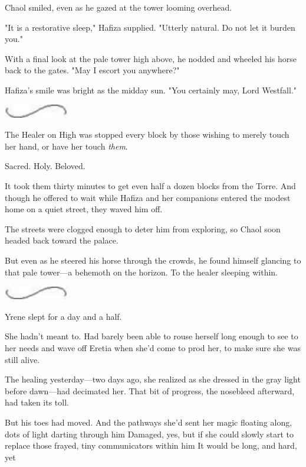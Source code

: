 Chaol smiled, even as he gazed at the tower looming overhead.

"It is a restorative sleep," Hafiza supplied. "Utterly natural. Do not let it burden you."

With a final look at the pale tower high above, he nodded and wheeled his horse back to the gates. "May I escort you anywhere?"

Hafiza's smile was bright as the midday sun. "You certainly may, Lord Westfall."

\includegraphics[width=1.12in,height=0.24in]{images/seperator}

The Healer on High was stopped every block by those wishing to merely touch her hand, or have her touch \emph{them}.

Sacred. Holy. Beloved.

It took them thirty minutes to get even half a dozen blocks from the Torre. And though he offered to wait while Hafiza and her companions entered the modest home on a quiet street, they waved him off.

The streets were clogged enough to deter him from exploring, so Chaol soon headed back toward the palace.

But even as he steered his horse through the crowds, he found himself glancing to that pale tower---a behemoth on the horizon. To the healer sleeping within.

\includegraphics[width=1.12in,height=0.24in]{images/seperator}

Yrene slept for a day and a half.

She hadn't meant to. Had barely been able to rouse herself long enough to see to her needs and wave off Eretia when she'd come to prod her, to make sure she was still alive.

The healing yesterday---two days ago, she realized as she dressed in the gray light before dawn---had decimated her. That bit of progress, the nosebleed afterward, had taken its toll.

But his toes had moved. And the pathways she'd sent her magic floating along, dots of light darting through him  Damaged, yes, but if she could slowly start to replace those frayed, tiny communicators within him  It would be long, and hard, yet 

